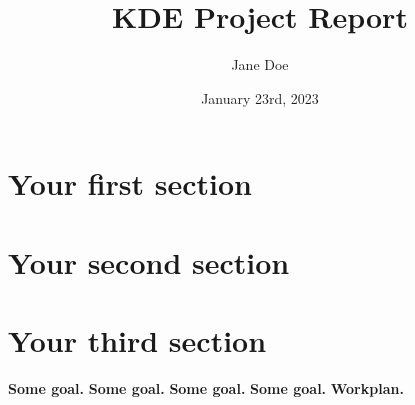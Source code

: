 \documentclass[a4paper]{scrartcl}
\title{KDE Project Report}
\author{Jane Doe}
\date{January 23rd, 2023}
\begin{document}
\maketitle

\section{Your first section}

\blindtext[1]\cite{goodfellow2016deep}

\section{Your second section}

\Blindtext[2]

\section{Your third section}

\Blindtext[1]

\textbf{Some goal.} \Blindtext[1]
\textbf{Some goal.} \Blindtext[1]
\textbf{Some goal.} \Blindtext[1]
\textbf{Some goal.} \Blindtext[1]
\textbf{Workplan.} \Blindtext[1]

\newpage


\end{document}
